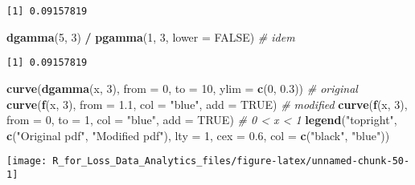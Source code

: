 \documentclass[]{book}
\newenvironment{Shaded}{\begin{snugshade}}{\end{snugshade}}
\newcommand{\KeywordTok}[1]{\textcolor[rgb]{0.13,0.29,0.53}{\textbf{#1}}}
\newcommand{\DataTypeTok}[1]{\textcolor[rgb]{0.13,0.29,0.53}{#1}}
\newcommand{\DecValTok}[1]{\textcolor[rgb]{0.00,0.00,0.81}{#1}}
\newcommand{\FloatTok}[1]{\textcolor[rgb]{0.00,0.00,0.81}{#1}}
\newcommand{\StringTok}[1]{\textcolor[rgb]{0.31,0.60,0.02}{#1}}
\newcommand{\CommentTok}[1]{\textcolor[rgb]{0.56,0.35,0.01}{\textit{#1}}}
\newcommand{\OtherTok}[1]{\textcolor[rgb]{0.56,0.35,0.01}{#1}}
\newcommand{\OperatorTok}[1]{\textcolor[rgb]{0.81,0.36,0.00}{\textbf{#1}}}
\newcommand{\NormalTok}[1]{#1}
\theoremstyle{definition}
\theoremstyle{definition}
\theoremstyle{definition}
\theoremstyle{remark}
\begin{document}
\begin{verbatim}
[1] 0.09157819
\end{verbatim}

\begin{Shaded}
\begin{Highlighting}[]
\KeywordTok{dgamma}\NormalTok{(}\DecValTok{5}\NormalTok{, }\DecValTok{3}\NormalTok{) }\OperatorTok{/}\StringTok{ }\KeywordTok{pgamma}\NormalTok{(}\DecValTok{1}\NormalTok{, }\DecValTok{3}\NormalTok{, }\DataTypeTok{lower =} \OtherTok{FALSE}\NormalTok{)  }\CommentTok{# idem}
\end{Highlighting}
\end{Shaded}

\begin{verbatim}
[1] 0.09157819
\end{verbatim}

\begin{Shaded}
\begin{Highlighting}[]
\KeywordTok{curve}\NormalTok{(}\KeywordTok{dgamma}\NormalTok{(x, }\DecValTok{3}\NormalTok{), }\DataTypeTok{from =} \DecValTok{0}\NormalTok{, }\DataTypeTok{to =} \DecValTok{10}\NormalTok{, }\DataTypeTok{ylim =} \KeywordTok{c}\NormalTok{(}\DecValTok{0}\NormalTok{, }\FloatTok{0.3}\NormalTok{))  }\CommentTok{# original}
\KeywordTok{curve}\NormalTok{(}\KeywordTok{f}\NormalTok{(x, }\DecValTok{3}\NormalTok{), }\DataTypeTok{from =} \FloatTok{1.1}\NormalTok{, }\DataTypeTok{col =} \StringTok{"blue"}\NormalTok{, }\DataTypeTok{add =} \OtherTok{TRUE}\NormalTok{)  }\CommentTok{# modified}
\KeywordTok{curve}\NormalTok{(}\KeywordTok{f}\NormalTok{(x, }\DecValTok{3}\NormalTok{), }\DataTypeTok{from =} \DecValTok{0}\NormalTok{, }\DataTypeTok{to =} \DecValTok{1}\NormalTok{, }\DataTypeTok{col =} \StringTok{"blue"}\NormalTok{, }\DataTypeTok{add =} \OtherTok{TRUE}\NormalTok{)  }\CommentTok{# 0 < x < 1}
\KeywordTok{legend}\NormalTok{(}\StringTok{"topright"}\NormalTok{, }\KeywordTok{c}\NormalTok{(}\StringTok{"Original pdf"}\NormalTok{, }\StringTok{"Modified pdf"}\NormalTok{), }
       \DataTypeTok{lty =} \DecValTok{1}\NormalTok{, }\DataTypeTok{cex =} \FloatTok{0.6}\NormalTok{, }\DataTypeTok{col =} \KeywordTok{c}\NormalTok{(}\StringTok{"black"}\NormalTok{, }\StringTok{"blue"}\NormalTok{))}
\end{Highlighting}
\end{Shaded}

\begin{center}\texttt{[image: R\_for\_Loss\_Data\_Analytics\_files/figure-latex/unnamed-chunk-50-1]} \end{center}
\end{document}
